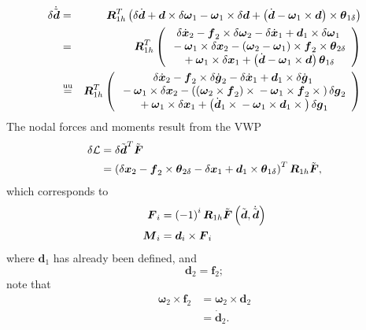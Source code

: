 \documentclass[10pt,dvips,fleqn]{report}
\newcommand{\T}[1]{\boldsymbol{#1}}
\newcommand{\equu}{\overset{\mathrm{uu}}{=}}
\begin{document}
\begin{eqnarray*}
	\delta\dot{\tilde{\T{d}}} & = & \T{R}_{1h}^T\plbr{
		\delta\dot{\T{d}}
		+ \T{d} \times \delta\T{\omega}_1
		- \T{\omega}_1 \times \delta\T{d}
		+ \plbr{
			\dot{\T{d}}
			- \T{\omega}_1 \times \T{d}
		}\times\T{\theta}_{1\delta}
	} \\
	& = & \T{R}_{1h}^T\plbr{\cvvect{
		\delta\dot{\T{x}}_2
		- \T{f}_2\times\delta\T{\omega}_2
		- \delta\dot{\T{x}}_1
		+ \T{d}_1\times\delta\T{\omega}_1 \\
	\mbox{} - \T{\omega}_1 \times \delta\T{x}_2
		- \plbr{
			\T{\omega}_2 
			- \T{\omega}_1
		} \times \T{f}_2 \times\T{\theta}_{2\delta} \\
	\mbox{} + \T{\omega}_1 \times \delta\T{x}_1
		+ \plbr{
			\dot{\T{d}} - \T{\omega}_1 \times \T{d}
		} \T{\theta}_{1\delta}
	}} \\
	& \equu & \T{R}_{1h}^T\plbr{\cvvect{
		\delta\dot{\T{x}}_2
		- \T{f}_2\times\delta\dot{\T{g}}_2
		- \delta\dot{\T{x}}_1
		+ \T{d}_1\times\delta\dot{\T{g}}_1 \\
	\mbox{} - \T{\omega}_1 \times \delta\T{x}_2
		- \plbr{
			\plbr{\T{\omega}_2 \times \T{f}_2}\times{}
			- \T{\omega}_1 \times \T{f}_2 \times{}
		} \delta\T{g}_2 \\
	\mbox{} + \T{\omega}_1 \times \delta\T{x}_1
		+ \plbr{
			\dot{\T{d}}_1 \times{}
			- \T{\omega}_1 \times \T{d}_1\times{}
		} \delta\T{g}_1
	}}
\end{eqnarray*}
The nodal forces and moments result from the VWP
\begin{align}
	\delta\mathcal{L} &= \delta \tilde{\T{d}}^T \tilde{\T{F}} \\
	&= \plbr{
		\delta{\T{x}}_2
		- \T{f}_2\times\T{\theta}_{2\delta}
		- \delta{\T{x}}_1
		+ \T{d}_1\times\T{\theta}_{1\delta}
	}^T \T{R}_{1h} \tilde{\T{F}} ,
\end{align}
which corresponds to
\begin{align}
	\T{F}_i &= \plbr{ -1 }^i \T{R}_{1h} \tilde{\T{F}}\plbr{\tilde{\T{d}}, \dot{\tilde{\T{d}}}} \\
	\T{M}_i &= \T{d}_i \times \T{F}_i
\end{align}
where $\T{d}_1$ has already been defined, and
\begin{equation}
	\T{d}_2 = \T{f}_2 ;
\end{equation}
note that
\begin{align}
	\T{\omega}_2\times\T{f}_2
	&= \T{\omega}_2\times\T{d}_2 \\
	&= \dot{\T{d}}_2 .
\end{align}
\end{document}
